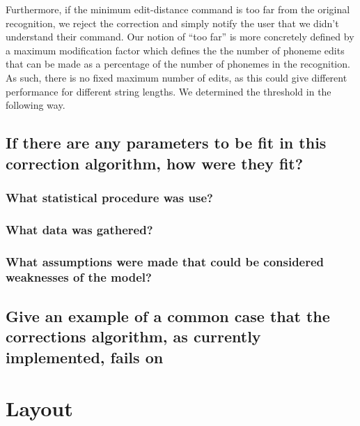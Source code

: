 \documentclass[]{article}
\begin{document}
Furthermore, if the minimum edit-distance command is too far from the original recognition, we reject the correction and simply notify the user that we didn't understand their command. Our notion of ``too far'' is more concretely defined by a maximum modification factor which defines the the number of phoneme edits that can be made as a percentage of the number of phonemes in the recognition. As such, there is no fixed maximum number of edits, as this could give different performance for different string lengths. We determined the threshold in the following way.

\subsection{If there are any parameters to be fit in this correction algorithm, how were they fit?}
\subsubsection{What statistical procedure was use?}
\subsubsection{What data was gathered?}
\subsubsection{What assumptions were made that could be considered weaknesses of the model?}
\subsection{Give an example of a common case that the corrections algorithm, as currently implemented, fails on}

\section{Layout}
\end{document}
